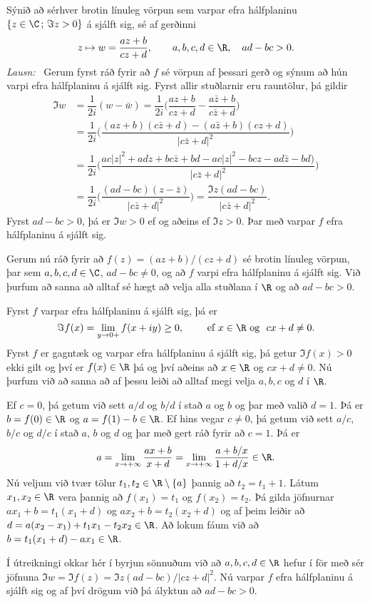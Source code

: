 \begin{sy}   Sýnið að sérhver brotin línuleg vörpun
sem varpar efra hálfplaninu $\{z\in \C\,;\, \Im z>0\}$ á sjálft sig,
sé af gerðinni
$$
z\mapsto w=\dfrac{az+b}{cz+d}, \qquad a,b,c,d\in \R, \quad ad-bc>0.
$$
{\it Lausn:} \ Gerum fyrst ráð fyrir að $f$ sé vörpun af þessari gerð
og sýnum að hún varpi efra hálfplaninu á sjálft sig.  Fyrst allir
stuðlarnir eru rauntölur, þá gildir
\begin{align*}
\Im w&=\dfrac 1{2i}(w-\bar w)=
\dfrac 1{2i}\bigg(\dfrac{az+b}{cz+d}-\dfrac{a\bar z+b}{c\bar z+d}\bigg)\\
&=\dfrac 1{2i}\bigg(\dfrac{(az+b)(c\bar z+d)-(a\bar z+b)(cz+d)}
{|c\bar z+d|^2}\bigg)\\
&=\dfrac 1{2i}\bigg(\dfrac{ac|z|^2+adz+bc\bar z+bd-ac|z|^2-bcz-ad
\bar z-bd)}
{|c\bar z+d|^2}\bigg)\\
&=\dfrac 1{2i}\bigg(\dfrac{(ad-bc)(z-\bar z)}
{|c\bar z+d|^2}\bigg)=\dfrac{\Im z(ad-bc)}
{|c\bar z+d|^2}.
\end{align*}
Fyrst $ad-bc>0$, þá er $\Im w>0$ ef og aðeins ef $\Im z>0$.  Þar með
varpar $f$ efra hálfplaninu á sjálft sig.

\smallskip
Gerum nú ráð fyrir að $f(z)=(az+b)/(cz+d)$ sé brotin línuleg vörpun,
þar sem $a,b,c,d\in \C$, $ad-bc\neq 0$, og að $f$ varpi efra
hálfplaninu á sjálft sig. Við þurfum að sanna að  alltaf sé
hægt að velja alla stuðlana í $\R$ og að  $ad-bc>0$.

\smallskip
Fyrst $f$ varpar efra hálfplaninu á sjálft sig, þá er
$$
\Im f(x)=\lim_{y\to 0+}f(x+iy)\geq 0, \qquad \text{ ef } x\in \R
\ \text{og } \ cx+d\neq 0.
$$ 
Fyrst $f$ er gagntæk og  varpar efra hálfplaninu á sjálft sig,
þá getur $\Im f(x)>0$ ekki gilt og því er
$f(x)\in \R$ þá og því aðeins að $x\in \R$ og $cx+d\neq 0$.  
Nú þurfum við að sanna að
af þessu leiði að alltaf megi velja $a,b,c$ og $d$ í $\R$.

Ef $c=0$, þá getum við sett $a/d$ og $b/d$ í stað $a$ og $b$ og þar
með  valið $d=1$.  Þá er $b=f(0)\in \R$ og $a=f(1)-b\in \R$.  Ef hins vegar
$c\neq 0$, þá getum við sett $a/c$, $b/c$ og $d/c$ í stað $a$, $b$ og
$d$ og þar með gert ráð fyrir að $c=1$.  Þá er 
$$
a=\lim_{x\to +\infty}\dfrac{ax+b}{x+d}=\lim_{x\to
+\infty}\dfrac{a+b/x}{1+d/x}\in \R.
$$
Nú veljum við tvær tölur $t_1,t_2\in \R\setminus\{a\}$ þannig að 
$t_2=t_1+1$.  Látum $x_1,x_2\in \R$ vera þannig að
$f(x_1)=t_1$ og $f(x_2)=t_2$.  Þá gilda jöfnurnar
$ax_1+b=t_1(x_1+d)$ og $ax_2+b=t_2(x_2+d)$ og af þeim leiðir
að $d=a(x_2-x_1)+t_1x_1-t_2x_2\in \R$.  Að lokum fáum við að
$b=t_1(x_1+d)-ax_1 \in \R$.

Í útreikningi okkar hér í byrjun sönnuðum  við að
$a,b,c,d\in \R$ hefur í för með sér jöfnuna
$\Im w = \Im f(z)=\Im z(ad-bc)/|cz+d|^2$. Nú varpar 
$f$ efra hálfplaninu  á sjálft sig og af því drögum við 
þá ályktun að  $ad-bc>0$.
\end{sy}


